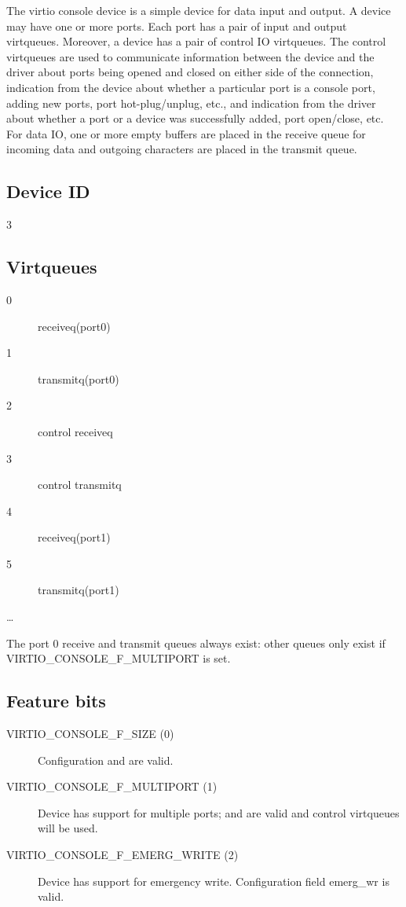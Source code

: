 The virtio console device is a simple device for data input and
output. A device may have one or more ports. Each port has a pair
of input and output virtqueues. Moreover, a device has a pair of
control IO virtqueues. The control virtqueues are used to
communicate information between the device and the driver about
ports being opened and closed on either side of the connection,
indication from the device about whether a particular port is a
console port, adding new ports, port hot-plug/unplug, etc., and
indication from the driver about whether a port or a device was
successfully added, port open/close, etc. For data IO, one or
more empty buffers are placed in the receive queue for incoming
data and outgoing characters are placed in the transmit queue.

\subsection{Device ID}\label{sec:Device Types / Console Device / Device ID}

  3

\subsection{Virtqueues}\label{sec:Device Types / Console Device / Virtqueues}

\begin{description}
\item[0] receiveq(port0)
\item[1] transmitq(port0)
\item[2] control receiveq
\item[3] control transmitq
\item[4] receiveq(port1)
\item[5] transmitq(port1)
\item[\ldots]
\end{description}

The port 0 receive and transmit queues always exist: other queues
only exist if VIRTIO_CONSOLE_F_MULTIPORT is set.

\subsection{Feature bits}\label{sec:Device Types / Console Device / Feature bits}

\begin{description}
\item[VIRTIO_CONSOLE_F_SIZE (0)] Configuration  and 
    are valid.

\item[VIRTIO_CONSOLE_F_MULTIPORT (1)] Device has support for multiple
    ports;  and  are
    valid and control virtqueues will be used.

\item[VIRTIO_CONSOLE_F_EMERG_WRITE (2)] Device has support for emergency write.
    Configuration field emerg_wr is valid.
\end{description}

